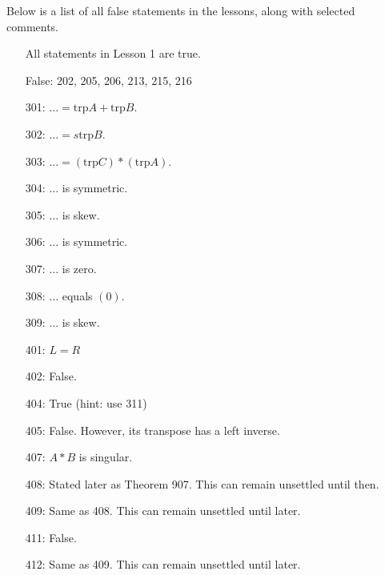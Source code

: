 \documentclass{article}
\begin{document}
Below is a list of all false statements in the lessons, along with selected comments. 
\vspace{0.5cm}

\begin{enumerate}
  \item[] All statements in Lesson 1 are true. 
\end{enumerate}
\vspace{0.5cm}

\begin{enumerate}
  \item[] False: 202, 205, 206, 213, 215, 216 
\end{enumerate}
\vspace{0.5cm}

\begin{enumerate}
  \item[301:] $\ldots = \text{trp} A + \text{trp} B$.
  \item[302:] $\ldots = s \text{trp} B$.
  \item[303:] $\ldots = (\text{trp} C) * (\text{trp} A)$.
  \item[304:] $\ldots$ is symmetric.
  \item[305:] $\ldots$ is skew.
  \item[306:] $\ldots$ is symmetric.
  \item[307:] $\ldots$ is zero.
  \item[308:] $\ldots$ equals $(0)$.
  \item[309:] $\ldots$ is skew. 
\end{enumerate}
\vspace{0.5cm}

\begin{enumerate}
  \item[401:] $L = R$
  \item[402:] False.
  \item[404:] True (hint: use 311)
  \item[405:] False. However, its transpose has a left inverse.
  \item[407:] $A*B$ is singular.
  \item[408:] Stated later as Theorem 907. This can remain unsettled until then.
  \item[409:] Same as 408. This can remain unsettled until later.
  \item[411:] False.
  \item[412:] Same as 409. This can remain unsettled until later.
\end{enumerate}
\vspace{0.5cm}
\end{document}
